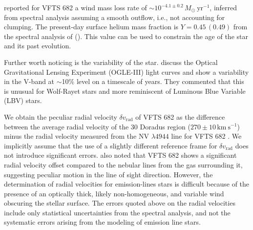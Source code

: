 \documentclass[a4paper,fleqn,usenatbib]{mnras}
\newcommand{\kms}{{\,\mathrm{km\ s^{-1}}}}
\newcommand{\Msun}{{\,\mathrm{M}_\odot}}
\begin{document}
\citet{bestenlehner:11} reported for VFTS 682 a wind mass loss rate of
$\sim10^{-4.1\pm0.2}\,M_\odot \ \mathrm{yr}^{-1}$, inferred from
spectral analysis assuming a smooth outflow, i.e., not accounting for
clumping. The present-day surface helium mass
fraction is $Y=0.45\, (0.49)$ from the spectral analysis of
\cite{bestenlehner:11} (\citealt{rubio-diez:17}). This value can be
used to constrain the age of the star and its past evolution.


Further worth noticing is the variability of the
star. %
\citet{bestenlehner:11} discuss the Optical Gravitational Lensing
Experiment (OGLE-III) light curves \citep{udalski:08} and show a
variability in the V-band at $\sim$10\% level on a timescale of years.
They commented that this is unusual for Wolf-Rayet stars and more reminiscent
of Luminous Blue Variable (LBV) stars. %

We obtain the peculiar radial velocity $\delta v_\mathrm{rad}$ of VFTS 682 as the difference
between the average radial velocity of the 30 Doradus region
($270\pm10\kms$) minus the radial velocity measured from the NV $\lambda4944$
line for VFTS 682  \citep[$300\pm10\kms$, ][]{bestenlehner:11}. We implicitly assume that the use
of a slightly different reference frame for $\delta v_\mathrm{rad}$ does not
introduce significant errors. \cite{bressert:12} also noted that VFTS
682 shows a significant radial velocity offset compared to the nebular
lines from the gas surrounding it, suggesting peculiar motion in the
line of sight direction. However, the determination of
radial velocities for emission-lines stars is difficult because of the
presence of an optically thick, likely non-homogeneous, and variable
wind obscuring the stellar surface. The errors quoted above on the
radial velocities include only statistical uncertainties from the
spectral analysis, and not the systematic errors arising from the
modeling of emission line stars.
\end{document}
